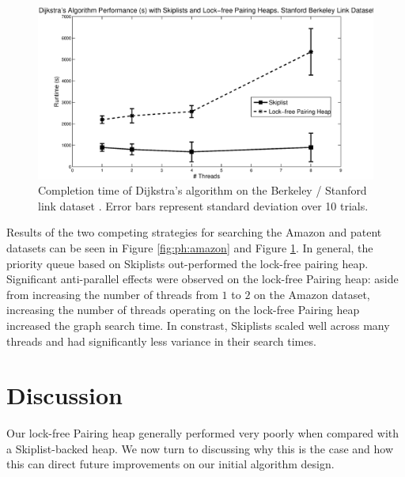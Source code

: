 \documentclass{acm_proc_article-sp}
\begin{document}
\begin{figure}
  \includegraphics[width=1.0\textwidth]{img/links.eps}
  \caption{Completion time of Dijkstra's algorithm on the Berkeley / Stanford link dataset  \cite{leskovec09}. Error bars represent standard deviation over 10 trials.}
  \label{fig:ph:patent}
\end{figure}

Results of the two competing strategies for searching the Amazon and patent datasets can be seen in Figure \ref{fig:ph:amazon} and Figure \ref{fig:ph:patent}.
In general, the priority queue based on Skiplists out-performed the lock-free pairing heap.
Significant anti-parallel effects were observed on the lock-free Pairing heap:
aside from increasing the number of threads from $1$ to $2$ on the Amazon dataset, 
increasing the number of threads operating on the lock-free Pairing heap increased
the graph search time. In constrast, Skiplists scaled well across many threads
and had significantly less variance in their search times.



\section{Discussion}
\label{sec:exp:disc}
Our lock-free Pairing heap generally performed very poorly
when compared with a Skiplist-backed heap. We now turn
to discussing why this is the case and how this
can direct future improvements on our initial
algorithm design.
\end{document}
